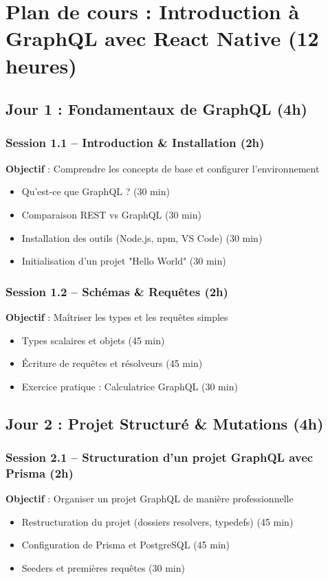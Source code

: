 \section*{Plan de cours : Introduction à GraphQL avec React Native (12 heures)}

\subsection*{Jour 1 : Fondamentaux de GraphQL (4h)}

\subsubsection*{Session 1.1 – Introduction & Installation (2h)}
\textbf{Objectif} : Comprendre les concepts de base et configurer l'environnement
\begin{itemize}
  \item Qu'est-ce que GraphQL ? (30 min)
  \item Comparaison REST vs GraphQL (30 min)
  \item Installation des outils (Node.js, npm, VS Code) (30 min)
  \item Initialisation d'un projet "Hello World" (30 min)
\end{itemize}

\vspace{0.3cm}
\subsubsection*{Session 1.2 – Schémas & Requêtes (2h)}
\textbf{Objectif} : Maîtriser les types et les requêtes simples
\begin{itemize}
  \item Types scalaires et objets (45 min)
  \item Écriture de requêtes et résolveurs (45 min)
  \item Exercice pratique : Calculatrice GraphQL (30 min)
\end{itemize}

\vspace{0.5cm}
\subsection*{Jour 2 : Projet Structuré & Mutations (4h)}

\subsubsection*{Session 2.1 – Structuration d’un projet GraphQL avec Prisma (2h)}
\textbf{Objectif} : Organiser un projet GraphQL de manière professionnelle
\begin{itemize}
  \item Restructuration du projet (dossiers resolvers, typedefs) (45 min)
  \item Configuration de Prisma et PostgreSQL (45 min)
  \item Seeders et premières requêtes (30 min)
\end{itemize}


